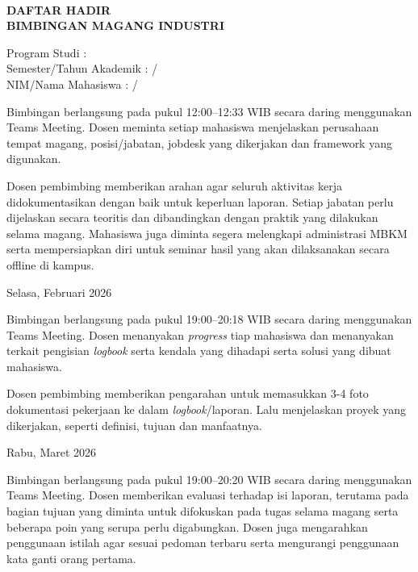 \documentclass[12pt, a4paper, oneside]{report}
\begin{document}
\\ %
\begin{center}
    \large\textbf{DAFTAR HADIR \\ BIMBINGAN MAGANG INDUSTRI}\\
\end{center}
\raggedright%
Program Studi               \tab: {\studyprogram} \\
Semester/Tahun Akademik     \tab: {\semester} / {\academicperiod} \\
NIM/Nama Mahasiswa          \tab: {\authornim} / {\authorname} \\

\begin{singlespace}
    \begin{dhbtable}
        {
            Bimbingan berlangsung pada pukul 12:00--12:33 WIB %
            secara daring menggunakan Teams Meeting. Dosen
            meminta setiap mahasiswa menjelaskan perusahaan
            tempat magang, posisi/jabatan, jobdesk yang
            dikerjakan dan framework yang digunakan.

            Dosen pembimbing memberikan arahan agar seluruh aktivitas kerja
            didokumentasikan dengan baik untuk keperluan laporan. Setiap jabatan perlu
            dijelaskan secara teoritis dan dibandingkan dengan praktik yang dilakukan
            selama magang. Mahasiswa juga diminta segera melengkapi administrasi MBKM serta
            mempersiapkan diri untuk seminar hasil yang akan dilaksanakan secara offline di
            kampus. }{Selasa, Februari 2026}{}

        {
            Bimbingan berlangsung pada pukul 19:00--20:18 WIB secara daring menggunakan
            Teams Meeting. Dosen menanyakan \textit{progress} tiap mahasiswa dan menanyakan
            terkait pengisian \textit{logbook} serta kendala yang dihadapi serta solusi
            yang dibuat mahasiswa.

            Dosen pembimbing memberikan pengarahan untuk memasukkan 3-4 foto dokumentasi
            pekerjaan ke dalam \textit{logbook}/laporan. Lalu menjelaskan proyek yang
            dikerjakan, seperti definisi, tujuan dan manfaatnya.}{Rabu, Maret
            2026}{ }

         { Bimbingan berlangsung pada pukul 19:00--20:20 WIB secara daring
            menggunakan Teams Meeting. Dosen memberikan evaluasi terhadap isi laporan,
            terutama pada bagian tujuan yang diminta untuk difokuskan pada tugas selama
            magang serta beberapa poin yang serupa perlu digabungkan. Dosen juga
            mengarahkan penggunaan istilah agar sesuai pedoman terbaru serta mengurangi
            penggunaan kata ganti orang pertama.%

}
\end{dhbtable}
\end{singlespace}
\end{document}
